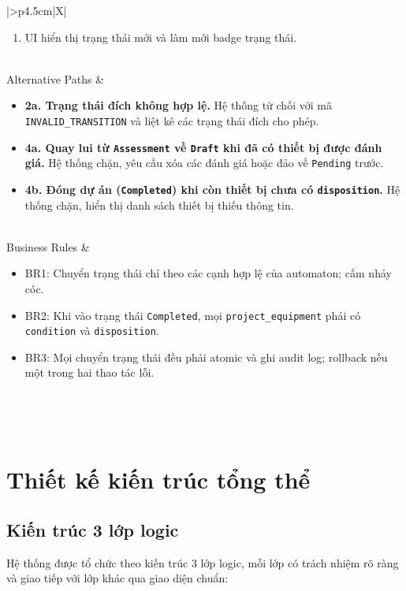 \begin{xltabular}{\textwidth}{|>{\bfseries}p{4.5cm}|X|}
\begin{enumerate}[leftmargin=*, nosep]
        \item UI hiển thị trạng thái mới và làm mới badge trạng thái.
    \end{enumerate} \\
    \hline
    Alternative Paths &
    \begin{itemize}[leftmargin=*, nosep]
        \item \textbf{2a. Trạng thái đích không hợp lệ.} Hệ thống từ chối với mã \texttt{INVALID\_TRANSITION} và liệt kê các trạng thái đích cho phép.
        \item \textbf{4a. Quay lui từ \texttt{Assessment} về \texttt{Draft} khi đã có thiết bị được đánh giá.} Hệ thống chặn, yêu cầu xóa các đánh giá hoặc đảo về \texttt{Pending} trước.
        \item \textbf{4b. Đóng dự án (\texttt{Completed}) khi còn thiết bị chưa có \texttt{disposition}.} Hệ thống chặn, hiển thị danh sách thiết bị thiếu thông tin.
    \end{itemize} \\
    \hline
    Business Rules &
    \begin{itemize}[leftmargin=*, nosep]
        \item BR1: Chuyển trạng thái chỉ theo các cạnh hợp lệ của automaton; cấm nhảy cóc.
        \item BR2: Khi vào trạng thái \texttt{Completed}, mọi \texttt{project\_equipment} phải có \texttt{condition} và \texttt{disposition}.
        \item BR3: Mọi chuyển trạng thái đều phải atomic và ghi audit log; rollback nếu một trong hai thao tác lỗi.
    \end{itemize} \\
    \hline
    \caption{Đặc tả Use Case: Chuyển trạng thái dự án} \\
\end{xltabular}

\section{Thiết kế kiến trúc tổng thể}
\label{sec:architecture}

\subsection{Kiến trúc 3 lớp logic}
Hệ thống được tổ chức theo kiến trúc 3 lớp logic, mỗi lớp có trách nhiệm rõ ràng và giao tiếp với lớp khác qua giao diện chuẩn:

